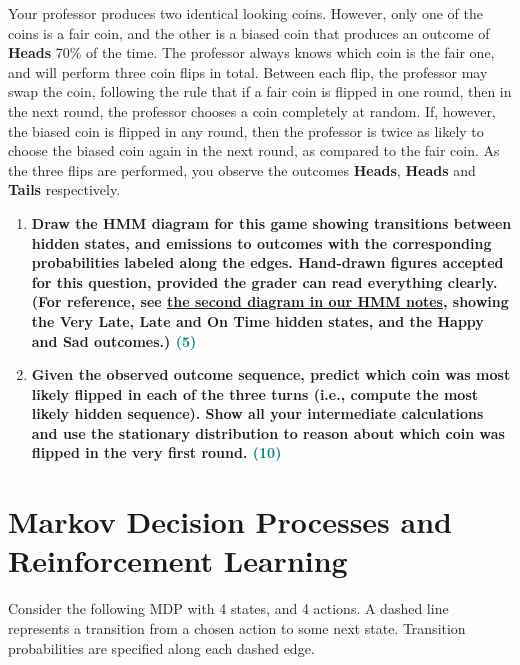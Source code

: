 \documentclass[a4paper]{article}
\begin{document}
\begin{sloppypar}
\noindent Your professor produces two identical looking coins. However, only one of the coins is a
fair coin, and the other is a biased coin that produces an outcome of \textbf{Heads} 70\% of the
time. The professor always knows which coin is the fair one, and will perform three coin
flips in total. Between each flip, the professor may swap the coin, following the rule that
if a fair coin is flipped in one round, then in the next round, the professor chooses a coin
completely at random. If, however, the biased coin is flipped in any round, then the professor 
is twice as likely to choose the biased coin again in the next round, as compared to
the fair coin. As the three flips are performed, you observe the outcomes \textbf{Heads}, \textbf{Heads}
and \textbf{Tails} respectively.


\begin{enumerate}[start=6,label=Q\arabic*,left=0pt]
    \item \textbf{Draw the HMM diagram for this game showing transitions between hidden states,
    and emissions to outcomes with the corresponding probabilities labeled along the edges.
    Hand-drawn figures accepted for this question, provided the grader can read everything
    clearly. (For reference, see \href{https://rajagopalvenkat.com/teaching/resources/AI/ch6.html\#hmm}{the second diagram in our HMM notes}, showing the Very Late,
    Late and On Time hidden states, and the Happy and Sad outcomes.) \hfill \textcolor{teal}{(5)}}

    \par

    \item \textbf{Given the observed outcome sequence, predict which coin was most likely flipped
    in each of the three turns (i.e., compute the most likely hidden sequence). Show all your
    intermediate calculations and use the stationary distribution to reason about which coin
    was flipped in the very first round. \hfill \textcolor{teal}{(10)}}

    \par 

\end{enumerate}

\section{Markov Decision Processes and Reinforcement Learning}

Consider the following MDP with 4 states, and 4 actions. A dashed line represents a
transition from a chosen action to some next state. Transition probabilities are specified
along each dashed edge.


\end{sloppypar}
\end{document}
